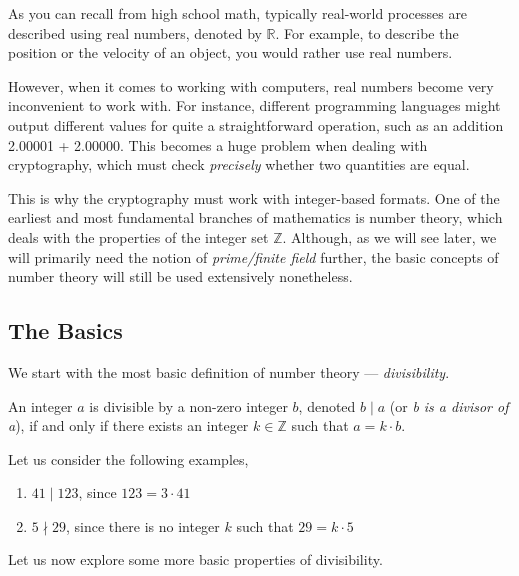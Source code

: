 \documentclass[../lecture-notes-148x210.tex]{subfiles}
\begin{document}
As you can recall from high school math, typically real-world processes are described
using real numbers, denoted by $\mathbb{R}$. For example, to describe the position or 
the velocity of an object, you would rather use real numbers. 

However, when it comes to working with computers, real numbers become very inconvenient 
to work with. For instance, different programming languages might output different values 
for quite a straightforward operation, such as an addition \textsf{2.00001 + 2.00000}. This becomes a huge problem 
when dealing with cryptography, which must check \textit{precisely} whether two quantities 
are equal.

This is why the cryptography must work with integer-based formats. One of the earliest and 
most fundamental branches of mathematics is number theory, which deals with the properties 
of the integer set $\mathbb{Z}$. Although, as we will see later, we will primarily need 
the notion of \emph{prime/finite field} further, the basic concepts of number theory will 
still be used extensively nonetheless.

\subsection{The Basics}

We start with the most basic definition of number theory --- \emph{divisibility}.

\begin{definition}
    \label{def:divisibility}
    An integer $a$ is divisible by a non-zero integer $b$, denoted $b \mid a$ (or \emph{b is a divisor of a}), if and only if there exists an integer $k \in \mathbb{Z}$ such that $a = k \cdot b$.
\end{definition}

\begin{example} 
    \label{example:divisibility_1}
    Let us consider the following examples,
    \begin{enumerate}
        \item $41 \mid 123$, since $123 = 3 \cdot 41$
        \item $5 \nmid 29$, since there is no integer $k$ such that $29 = k \cdot 5$
    \end{enumerate}
\end{example}

Let us now explore some more basic properties of divisibility. 
\end{document}
